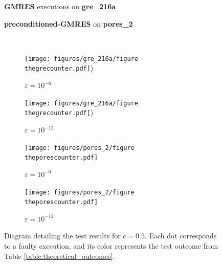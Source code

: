 \documentclass[twoside]{article}
\newcounter{fig}\setcounter{fig}{0}
\begin{document}
  \begin{figure}[H]
    \centering
    
    \begin{minipage}[b]{0.45\linewidth}
      \centering
      \textbf{GMRES} executions on \textbf{gre_216a} 
    \end{minipage}
    \quad
    \begin{minipage}{0.45\linewidth}
      \centering
      \textbf{preconditioned-GMRES} on \textbf{pores_2}
    \end{minipage}\\


    \begin{minipage}[b]{0.48\linewidth}
      
      \begin{subfigure}[t]{\linewidth}
        \centering
        \texttt{[image: figures/gre\_216a/figure\\thegrecounter.pdf]})
        \caption{$\varepsilon = 10^{-6}$}\label{fig:gre_216a_test_result_c05_oracle_0}	
      \end{subfigure}
      \quad
      \begin{subfigure}[t]{\linewidth}
        \centering
        \texttt{[image: figures/gre\_216a/figure\\thegrecounter.pdf]})
        \caption{$\varepsilon = 10^{-12}$}\label{fig:gre_216a_test_result_c05_oracle_1}	
      \end{subfigure}
    \end{minipage}
    \quad
    \begin{minipage}[b]{0.48\linewidth}
      
      \begin{subfigure}[t]{\linewidth}
        \centering
        \texttt{[image: figures/pores\_2/figure\\theporescounter.pdf]}
        \caption{$\varepsilon = 10^{-6}$}\label{fig:pores_2_test_result_c05_oracle_0}	
      \end{subfigure}
      \quad
      \begin{subfigure}[t]{\linewidth}
        \centering
        \texttt{[image: figures/pores\_2/figure\\theporescounter.pdf]}
        \caption{$\varepsilon = 10^{-12}$}\label{fig:pores_2_test_result_c05_oracle_1}	
      \end{subfigure}

    \end{minipage}
    \caption{Diagram detailing the test results for $c = 0.5$. Each dot corresponds to a faulty execution, and its color represents the test outcome from Table \ref{table:theoretical_outcomes}.}
    \label{fig:test_result_oracle_c05}
  \end{figure}
\end{document}
